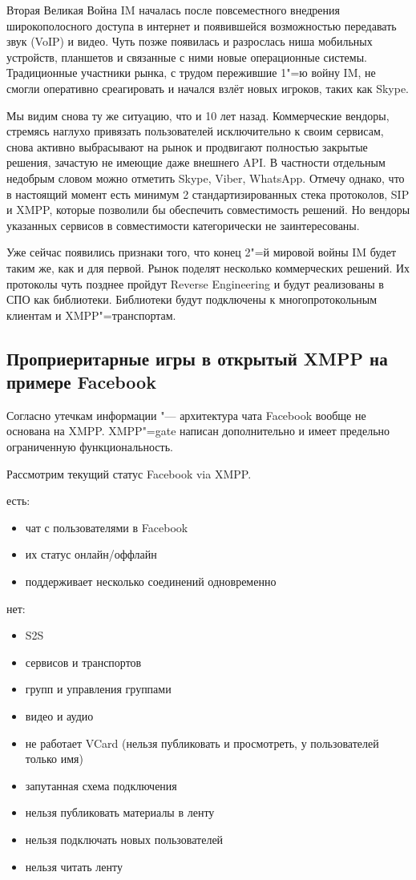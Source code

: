 \documentclass[10pt, a5paper]{article}
\begin{document}
Вторая Великая Война IM началась после повсеместного внедрения широкополосного доступа в интернет и появившейся возможностью передавать звук (VoIP) и видео. Чуть позже появилась и разрослась ниша мобильных устройств, планшетов и связанные с ними новые операционные системы. Традиционные участники рынка,  с трудом пережившие 1"=ю войну IM, не смогли оперативно среагировать и начался взлёт новых игроков, таких как Skype.

Мы видим снова ту же ситуацию, что и 10 лет назад. Коммерческие вендоры, стремясь наглухо привязать пользователей исключительно к своим сервисам, снова активно выбрасывают на рынок и продвигают полностью закрытые решения, зачастую не имеющие даже внешнего API. В частности отдельным недобрым словом можно отметить Skype, Viber, WhatsApp.  Отмечу однако, что в настоящий момент есть минимум 2 стандартизированных стека протоколов, SIP и XMPP, которые позволили бы обеспечить совместимость решений.  Но вендоры указанных сервисов в совместимости категорически не заинтересованы.

Уже сейчас появились признаки того, что конец 2"=й мировой войны IM будет таким же, как и для первой. Рынок поделят несколько коммерческих решений. Их  протоколы чуть позднее пройдут Reverse Engineering и будут реализованы в СПО как библиотеки. Библиотеки будут подключены  к многопротокольным клиентам и XMPP"=транспортам.

\subsection*{Проприеритарные игры в открытый XMPP на примере Facebook}

Согласно утечкам информации "--- архитектура чата Facebook вообще не основана на XMPP. XMPP"=gate написан дополнительно и имеет предельно ограниченную функциональность.

Рассмотрим текущий статус Facebook via XMPP.

есть:

\begin{itemize}
  \item чат с пользователями в Facebook
  \item их статус онлайн/оффлайн
  \item поддерживает несколько соединений одновременно
\end{itemize}

нет:

\begin{itemize}
  \item S2S
  \item сервисов и транспортов
  \item групп и управления группами
  \item видео и аудио
  \item не работает VCard (нельзя публиковать и просмотреть, у пользователей только имя)
  \item запутанная схема подключения
  \item нельзя публиковать материалы в ленту
  \item нельзя подключать новых пользователей
  \item нельзя читать ленту
\end{itemize}
\end{document}
